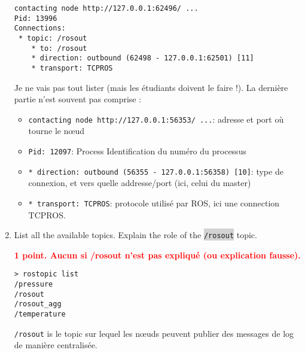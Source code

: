 \documentclass[10pt,a4paper,english]{exam}
\newcommand{\mytext}[1]{\colorbox{lightgray}{\texttt{#1}}}
\begin{document}
\begin{enumerate}
\begin{solution}
\begin{verbatim}
contacting node http://127.0.0.1:62496/ ...
Pid: 13996
Connections:
 * topic: /rosout
    * to: /rosout
    * direction: outbound (62498 - 127.0.0.1:62501) [11]
    * transport: TCPROS\end{verbatim}
		      Je ne vais pas tout lister (mais les étudiants doivent le faire !). La dernière partie
		      n'est souvent pas comprise :
		      \begin{itemize}
			      \item \verb+contacting node http://127.0.0.1:56353/ ...+: adresse et port où
			            tourne le nœud
			      \item \verb+Pid: 12097+: Process Identification du numéro du processus
			      \item  \verb+* direction: outbound (56355 - 127.0.0.1:56358) [10]+: type de
			            connexion, et vers quelle addresse/port (ici, celui du master)
			      \item \verb+* transport: TCPROS+: protocole utilisé par ROS, ici une connection
			            TCPROS.
		      \end{itemize}
	      \end{solution}
	\item List all the available topics. Explain the role of the \mytext{/rosout} topic.
	      \begin{solution}\textbf{\textcolor{red}{1 point. Aucun si /rosout n'est pas expliqué (ou explication fausse).}}
		      \begin{verbatim}
> rostopic list
/pressure
/rosout
/rosout_agg
/temperature
			   \end{verbatim}
		      \texttt{/rosout} is le topic sur lequel les nœuds peuvent publier des messages de log de manière
		      centralisée.
	      \end{solution}


\end{enumerate}
\end{document}
